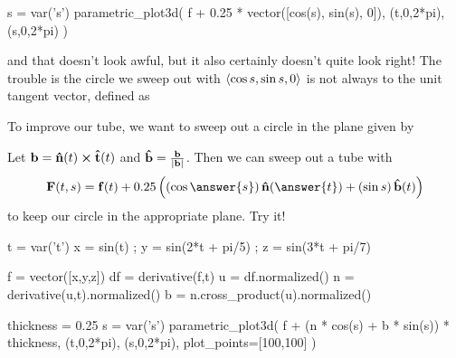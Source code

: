 \documentclass{ximera}
\begin{document}
\begin{example}
\begin{sageCell}
s = var('s')
parametric_plot3d( f + 0.25 * vector([cos(s), sin(s), 0]), (t,0,2*pi), (s,0,2*pi) )
\end{sageCell}
and that doesn't look awful, but it also certainly doesn't quite look
right!  The trouble is the circle we sweep out with
$\left\langle \cos s, \sin s, 0\right\rangle$ is not always
 to the
unit tangent vector, defined as
\begin{multipleChoice}
\end{multipleChoice}
To improve our tube, we want to sweep out a circle in the plane given by
\begin{multipleChoice}
\end{multipleChoice}
Let $\mathbf{b} = \mathbf{\hat{n}}(t) \boldsymbol\times \mathbf{\hat{t}}(t)$ and $\mathbf{\hat{b}} = \frac{\mathbf{b}}{| \mathbf{b} |}$.  Then we can sweep out a tube with
  \[
    \vec{F}(t,s) = \vec{f}(t) + 0.25 \left( \left( \cos \answer{s} \right) \unormal(\answer{t}) + \left( \sin s \right) \ubinormal(t) \right)
  \]
  to keep our circle in the appropriate plane.  Try it!
\begin{sageCell}
t = var('t')
x = sin(t) ; y = sin(2*t + pi/5) ; z = sin(3*t + pi/7)

f = vector([x,y,z])
df = derivative(f,t)
u = df.normalized()
n = derivative(u,t).normalized()
b = n.cross_product(u).normalized()

thickness = 0.25
s = var('s')
parametric_plot3d( f + (n * cos(s) + b * sin(s)) * thickness, (t,0,2*pi), (s,0,2*pi), plot_points=[100,100] )
\end{sageCell}
\end{example}  
\end{document}
